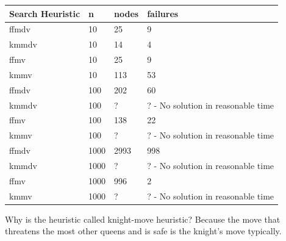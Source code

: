 \documentclass[a4paper, 11pt]{article}
\begin{document}
\begin{center}
  \begin{tabular}{ | l | l | l | p{7cm} |}
    \hline
    \textbf{Search Heuristic} & \textbf{n} & \textbf{nodes} & \textbf{failures} \\ \hline
    ffmdv & 10 & 25 & 9 \\\hline
    kmmdv & 10 & 14 & 4 \\\hline
    ffmv & 10 & 25 & 9 \\\hline
    kmmv & 10 & 113 & 53 \\\hline
    ffmdv & 100 & 202 & 60 \\\hline
    kmmdv & 100 & ? & ? - No solution in reasonable time \\\hline
    ffmv & 100 & 138 & 22 \\\hline
    kmmv & 100 & ? & ? - No solution in reasonable time \\\hline
    ffmdv & 1000 & 2993 & 998 \\\hline
    kmmdv & 1000 & ? & ? - No solution in reasonable time \\\hline
    ffmv & 1000 & 996 & 2 \\\hline
    kmmv & 1000 & ? & ? - No solution in reasonable time \\\hline    
  \end{tabular}
\end{center}

Why is the heuristic called knight-move heuristic? Because the move that threatens the most other queens and is safe is the knight's move typically.
\end{document}
